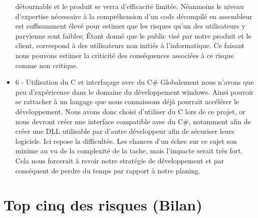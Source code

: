 \begin{itemize}
	détournable et le produit se verra d'efficacité limitée. Néanmoins le niveau d'expertise nécessaire à la compréhension d'un code décompilé 
	en assembleur est suffisamment élevé pour estimer que les risques qu'un des utilisateurs y parvienne sont faibles; Étant donné que le public
	visé par notre produit et le client, correspond à des utilisateurs non initiés à l'informatique. Ce faisant nous pouvons estimer la criticité 
	des conséquences associées à ce risque comme non critique.\newline
	\item 6 - Utilisation du C et interfaçage avec du C\#\newline
	Globalement nous n'avons que peu d'expéricence dans le domaine du développement windows. Ainsi pouvoir se rattacher à un langage que nous
	connaissons déjà pourrait accélérer le développement. Nous avons donc choisi d'utiliser du C lors de ce projet, or nous devront créer une 
	interface compatible avec du C\#, notamment afin de créer une DLL utilisable par d'autre développeur afin de sécuriser leurs logiciels.
	Ici repose la difficultée. Les chances d'un échec sur ce sujet son minime au vu de la complexité de la tache, mais l'impacte serait très fort.
	Cela nous forcerait à revoir notre stratégie de développement et par conséquent de perdre du temps par rapport à notre planing.
\end{itemize}

\chapter{Top cinq des risques (Bilan)}


